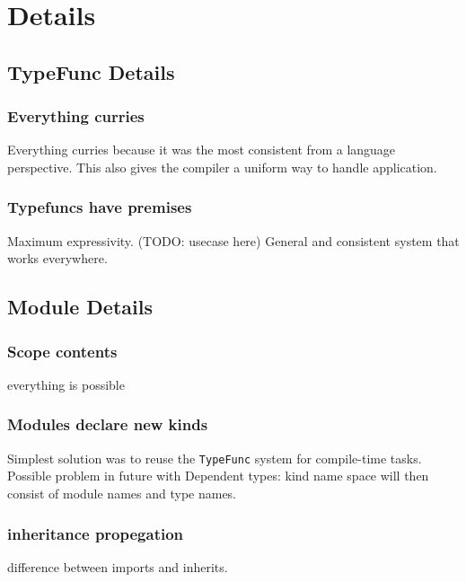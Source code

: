 \section{Details}

\pagebreak

\subsection{TypeFunc Details}
\begin{multicols}{2}
  \subsubsection*{Everything curries}
  Everything curries because it was the most consistent from a language perspective.
  This also gives the compiler a uniform way to handle application.
  
  \subsubsection*{Typefuncs have premises}
  Maximum expressivity. (TODO: usecase here)
  General and consistent system that works everywhere.
\end{multicols}

\pagebreak
\subsection{Module Details}
\begin{multicols}{2}
  \subsubsection*{Scope contents}
  everything is possible
  \subsubsection*{Modules declare new kinds}
  Simplest solution was to reuse the \texttt{TypeFunc} system for compile-time tasks.
  Possible problem in future with Dependent types: kind name space will then consist of module names and type names.
  \subsubsection*{inheritance propegation}
  difference between imports and inherits.
\end{multicols}


